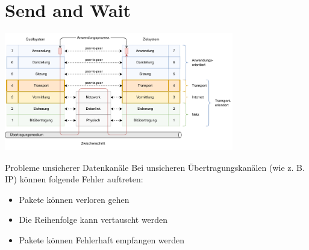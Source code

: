 \section{Send and Wait}

\includegraphics[width=0.75\textwidth]{includes/figures/defi_iso_osi_transport_und_vermittlung.pdf}

\begin{bonus}{Probleme unsicherer Datenkanäle}
    Bei unsicheren Übertragungskanälen (wie z. B. IP) können folgende Fehler auftreten:
    \begin{itemize}
        \item Pakete können verloren gehen
        \item Die Reihenfolge kann vertauscht werden
        \item Pakete können Fehlerhaft empfangen werden
    \end{itemize}
\end{bonus}

